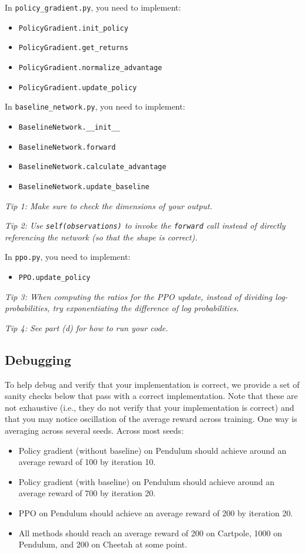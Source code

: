 \documentclass{article}
\begin{document}
In \texttt{policy\_gradient.py}, you need to implement:
\begin{itemize}
\item \texttt{PolicyGradient.init\_policy}
\item \texttt{PolicyGradient.get\_returns}
\item \texttt{PolicyGradient.normalize\_advantage}
\item \texttt{PolicyGradient.update\_policy}
\end{itemize}

In \texttt{baseline\_network.py}, you need to implement:
\begin{itemize}
\item \texttt{BaselineNetwork.\_\_init\_\_}
\item \texttt{BaselineNetwork.forward}
\item \texttt{BaselineNetwork.calculate\_advantage}
\item \texttt{BaselineNetwork.update\_baseline}
\end{itemize}

\emph{Tip 1: Make sure to check the dimensions of your output.}

\emph{Tip 2: Use \texttt{self(observations)} to invoke the \texttt{forward} call instead of directly referencing the network (so that the shape is correct).}
   
In \texttt{ppo.py}, you need to implement:
\begin{itemize}
\item \texttt{PPO.update\_policy}
\end{itemize}
\emph{Tip 3: When computing the ratios for the PPO update, instead of dividing log-probabilities, try exponentiating the difference of log probabilities.}

\emph{Tip 4: See part (d) for how to run your code.}

   
\subsection{Debugging}

To help debug and verify that your implementation is correct, we provide a set of sanity checks below that pass with a correct implementation. Note that these are not exhaustive (i.e., they do not verify that your implementation is correct) and that you may notice oscillation of the average reward across training. One way is averaging across several seeds.
Across most seeds:
\begin{itemize}
    \item Policy gradient (without baseline) on Pendulum should achieve around an average reward of 100 by iteration 10.
    \item Policy gradient (with baseline) on Pendulum should achieve around an average reward of 700 by iteration 20.
    \item PPO on Pendulum should achieve an average reward of 200 by iteration 20.
    \item All methods should reach an average reward of 200 on Cartpole, 1000 on Pendulum, and 200 on Cheetah at some point.
\end{itemize}
\end{document}
